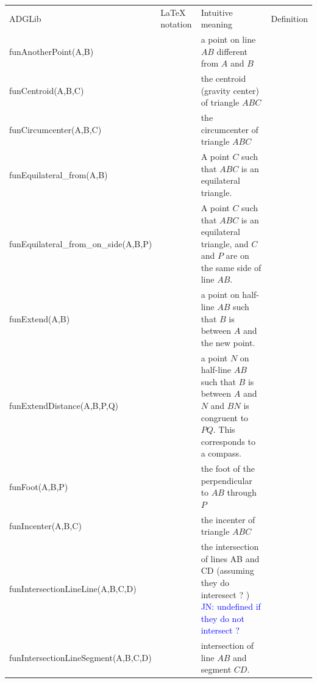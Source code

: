 \documentclass[a4wide,9pt,landscape]{article}
\newcommand{\jn}[1]{\textcolor{blue}{JN: #1}}
\begin{document}
\noindent\hspace{-75mm}
\begin{tabularx}{270mm}{>{\ttfamily}llXX}
\toprule
\multicolumn{4}{l}{\Huge Points-only; non-deterministic function symbols} \\ \midrule
ADGLib & 
\LaTeX{} notation & 
Intuitive meaning & 
Definition \\ \midrule
funAnotherPoint(A,B) & 
&
a point on line $AB$ different from $A$ and $B$ \\
funCentroid(A,B,C) & 
&
the centroid (gravity center) of triangle $ABC$ \\
funCircumcenter(A,B,C) & 
&
the circumcenter of triangle $ABC$ \\
funEquilateral\_from(A,B) & 
&
A point $C$ such that $ABC$ is an equilateral triangle. \\
funEquilateral\_from\_on\_side(A,B,P) & 
&
A point $C$ such that $ABC$ is an equilateral triangle, and $C$ and $P$ are on the same side of line $AB$. \\
funExtend(A,B) & &
a point on half-line $AB$ such that $B$ is between $A$ and the new point. \\
funExtendDistance(A,B,P,Q) & &
a point $N$ on half-line $AB$ such that $B$ is between $A$ and $N$ and $BN$ is congruent to $PQ$. This corresponds to a compass. \\
funFoot(A,B,P) & 
&
the foot of the perpendicular to $AB$ through $P$ \\
funIncenter(A,B,C) & 
&
the incenter of triangle $ABC$ \\
funIntersectionLineLine(A,B,C,D) & 
&
the intersection of lines AB and CD (assuming they do interesect ? ) \jn{undefined if they do not intersect ?}\\
funIntersectionLineSegment(A,B,C,D) & 
&
intersection of line $AB$ and segment $CD$. \\

\end{tabularx}
\end{document}
